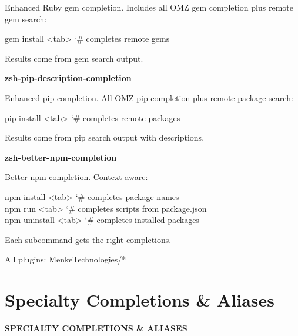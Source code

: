 \documentclass[11pt,a4paper,twoside]{book}
\begin{document}
Enhanced Ruby gem completion. Includes all OMZ gem completion plus remote gem search:

\begin{codebox}
\color{neongreen}gem install <tab>         {\char`\#} completes remote gems\\
\end{codebox}

Results come from gem search output.


\vspace{12pt}
{\bfseries\color{neonyellow} zsh-pip-description-completion}\vspace{4pt}

Enhanced pip completion. All OMZ pip completion plus remote package search:

\begin{codebox}
\color{neongreen}pip install <tab>         {\char`\#} completes remote packages\\
\end{codebox}

Results come from pip search output with descriptions.


\vspace{12pt}
{\bfseries\color{neonyellow} zsh-better-npm-completion}\vspace{4pt}

Better npm completion. Context-aware:

\begin{codebox}
\color{neongreen}npm install <tab>         {\char`\#} completes package names\\
\color{neongreen}npm run <tab>             {\char`\#} completes scripts from package.json\\
\color{neongreen}npm uninstall <tab>       {\char`\#} completes installed packages\\
\end{codebox}

Each subcommand gets the right completions.

All plugins: MenkeTechnologies/*


\vspace{16pt}

\section{Specialty Completions \& Aliases}


\vspace{10pt}
{\large\bfseries\color{neoncyan} SPECIALTY COMPLETIONS \& ALIASES}\vspace{6pt}
\end{document}
